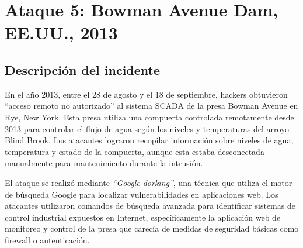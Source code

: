 \newpage
\section{Ataque 5: Bowman Avenue Dam, EE.UU., 2013}

\begin{paracol}{2}
    
    \subsection{Descripción del incidente}

    \colfill
    En el año 2013, entre el 28 de agosto y el 18 de septiembre, hackers obtuvieron ``acceso remoto no autorizado'' al sistema \textsc{SCADA} de la presa Bowman Avenue en Rye, New York. Esta presa utiliza una compuerta controlada remotamente desde 2013 para controlar el flujo de agua según los niveles y temperaturas del arroyo Blind Brook. Los atacantes lograron \ul{recopilar información sobre niveles de agua, temperatura y estado de la compuerta, aunque esta estaba desconectada manualmente para mantenimiento durante la intrusión.}

    El ataque se realizó mediante \textit{``Google dorking''}, una técnica que utiliza el motor de búsqueda Google para localizar vulnerabilidades en aplicaciones web. Los atacantes utilizaron comandos de búsqueda avanzada para identificar sistemas de control industrial expuestos en Internet, específicamente la aplicación web de monitoreo y control de la presa que carecía de medidas de seguridad básicas como firewall o autenticación.


    
    
    \colfill

    \switchcolumn


\end{paracol}
